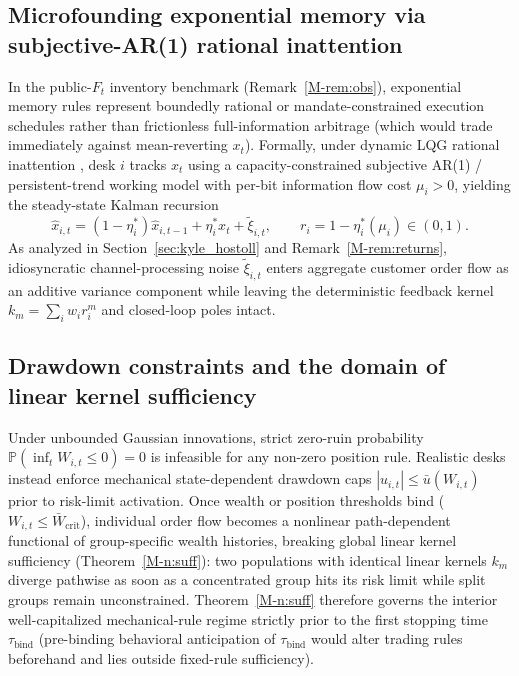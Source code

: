 \documentclass[12pt]{article}
\theoremstyle{definition}
\theoremstyle{remark}
\begin{document}
\subsection{Microfounding exponential memory via subjective-AR(1) rational inattention}\label{sec:inattention}
In the public-$F_t$ inventory benchmark (Remark~\ref{M-rem:obs}), exponential memory rules represent boundedly rational or mandate-constrained execution schedules rather than frictionless full-information arbitrage (which would trade immediately against mean-reverting $x_t$). Formally, under dynamic LQG rational inattention \citep{sims2003,mackowiak2009}, desk $i$ tracks $x_t$ using a capacity-constrained subjective AR(1) / persistent-trend working model with per-bit information flow cost $\mu_i > 0$, yielding the steady-state Kalman recursion
\[
  \hat{x}_{i,t} = (1 - \eta_i^*) \hat{x}_{i,t-1} + \eta_i^* x_t + \tilde{\xi}_{i,t}, \qquad r_i = 1 - \eta_i^*(\mu_i) \in (0, 1).
\]
As analyzed in Section~\ref{sec:kyle_hostoll} and Remark~\ref{M-rem:returns}, idiosyncratic channel-processing noise $\tilde{\xi}_{i,t}$ enters aggregate customer order flow as an additive variance component while leaving the deterministic feedback kernel $k_m = \sum_i w_i r_i^m$ and closed-loop poles intact.

\subsection{Drawdown constraints and the domain of linear kernel sufficiency}\label{sec:solvency}
Under unbounded Gaussian innovations, strict zero-ruin probability $\mathbb{P}(\inf_t W_{i,t} \le 0) = 0$ is infeasible for any non-zero position rule. Realistic desks instead enforce mechanical state-dependent drawdown caps $|u_{i,t}| \le \bar{u}(W_{i,t})$ prior to risk-limit activation. Once wealth or position thresholds bind ($W_{i,t} \le \bar{W}_{\mathrm{crit}}$), individual order flow becomes a nonlinear path-dependent functional of group-specific wealth histories, breaking global linear kernel sufficiency (Theorem~\ref{M-n:suff}): two populations with identical linear kernels $k_m$ diverge pathwise as soon as a concentrated group hits its risk limit while split groups remain unconstrained. Theorem~\ref{M-n:suff} therefore governs the interior well-capitalized mechanical-rule regime strictly prior to the first stopping time $\tau_{\mathrm{bind}}$ (pre-binding behavioral anticipation of $\tau_{\mathrm{bind}}$ would alter trading rules beforehand and lies outside fixed-rule sufficiency).
\end{document}
